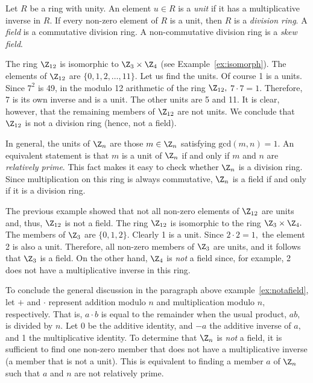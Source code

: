 \begin{definition}
Let $R$ be a ring with unity.  An element $u \in R$ is a \emph{unit}
if it has a multiplicative inverse in $R.$  If every non-zero element
of $R$ is a unit, then $R$ is a \emph{division ring}.  A \emph{field}
is a commutative division ring.  A non-commutative division ring is a
\emph{skew field}.
\end{definition}
\begin{example}
The ring 
$\Z_{12} $ is isomorphic to 
$\Z_3 \times \Z_4$ (see Example~\ref{ex:isomorph}).
The elements of $\Z_{12}$ are $\{0, 1, 2, \ldots, 11\}.$  Let
us find the units.  Of course 1 is a units.  Since $7^2$ is
49, in the modulo 12 arithmetic of the ring $\Z_{12},$ $7
\cdot 7 = 1.$  Therefore, 7 is its own inverse and is a unit.  The
other units are 5 and 11.  It is clear, however, that the remaining
members of $\Z_{12}$ are not units.  We conclude that
$\Z_{12}$ is not a division ring (hence, not a field).
\end{example}
In general, the units of 
$\Z_n$ 
are those $m \in \Z_n$ satisfying
$\mbox{gcd}(m,n) = 1$.  An equivalent statement is that $m$ is a unit
of $\Z_n$ if and only if $m$ and $n$ are 
\emph{relatively prime}. 
This fact makes it easy to check whether 
$\Z_n$ is a division ring.
Since multiplication on this ring is always commutative, 
$\Z_n$ is a field if and only if it is a division ring.
\begin{example}
\label{ex:notafield}
The previous example showed that not all non-zero elements of
$\Z_{12}$ 
are units and, thus, $\Z_{12}$ is not a field.  
The ring $\Z_{12}$ is isomorphic to the ring $\Z_3
\times \Z_4.$
The members of $\Z_3$ are $\{0,1,2\}.$  Clearly 1 is a unit.
Since $2 \cdot 2 = 1,$ the element 2 is also a unit.  Therefore, all
non-zero members of $\Z_3$ are units, and it follows that
$\Z_3$ is a field. On the other hand, $\Z_4$ is
\emph{not} a field since, for example, 2 does not have a multiplicative inverse in
this ring. 
\end{example}

To conclude the general discussion in the paragraph above
example~\ref{ex:notafield}, let $+$ and $\cdot$ represent addition
modulo $n$ and multiplication modulo $n,$ respectively.
That is, $a \cdot b$ is equal to the remainder when the usual product,
$ab,$ is divided by $n.$  Let 0 be the additive identity, and $-a$ the
additive inverse of $a,$ and 1 the multiplicative identity.  To determine
that $\Z_n$ is \emph{not} a field, it is sufficient to find
one non-zero member that does not have a multiplicative inverse
(\ie a member that is not a unit). This is equivalent to finding a
member $a$ of $\Z_n$ such that $a$ and $n$ are not relatively
prime.   

